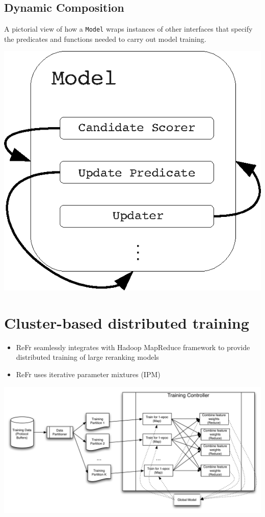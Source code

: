 \documentclass[noback,portrait,twocolumn]{cuposter}
\begin{document}
\subsection{Dynamic Composition}
A pictorial view of how a \texttt{Model}
wraps instances of other interfaces that specify the predicates and
functions needed to carry out model training.

\begin{center}
\includegraphics[bb=120bp 400bp 345bp 610bp,clip,scale=2.0]{figures/model-diagram.eps}
\end{center}

\section{Cluster-based distributed training}
\begin{itemize}
  \item ReFr seamlessly integrates with Hadoop MapReduce framework to provide distributed training of large reranking models
  \item ReFr uses iterative parameter mixtures (IPM) \cite{mcdonald10distributed}
\end{itemize}

\vspace{1cm}
\begin{center}
\hspace{-9cm} \includegraphics[scale=1.4]{figures/mapreduceflow} 
\end{center}
\end{document}
